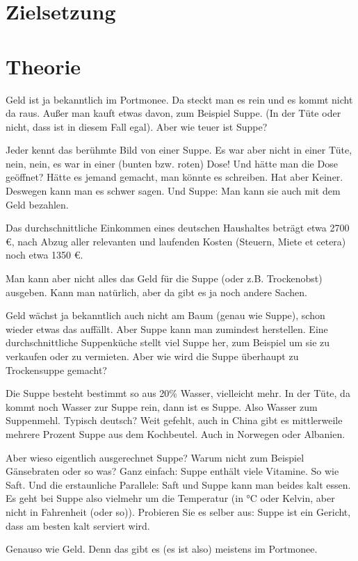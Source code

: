 \section{Zielsetzung}

\section{Theorie}
\label{sec:Theorie}
Geld ist ja bekanntlich im Portmonee. Da steckt man es rein und es kommt nicht da raus. Außer man kauft etwas davon, zum Beispiel Suppe. (In der Tüte oder nicht, dass ist in diesem Fall egal). Aber wie teuer ist Suppe?

Jeder kennt das berühmte Bild von einer Suppe. Es war aber nicht in einer Tüte, nein, nein, es war in einer (bunten bzw. roten) Dose! Und hätte man die Dose geöffnet? Hätte es jemand gemacht, man könnte es schreiben. Hat aber Keiner. Deswegen kann man es schwer sagen. Und Suppe: Man kann sie auch mit dem Geld bezahlen.

Das durchschnittliche Einkommen eines deutschen Haushaltes beträgt etwa 2700 €, nach Abzug aller relevanten und laufenden Kosten (Steuern, Miete et cetera) noch etwa 1350 €.

Man kann aber nicht alles das Geld für die Suppe (oder z.B. Trockenobst) ausgeben. Kann man natürlich, aber da gibt es ja noch andere Sachen.

Geld wächst ja bekanntlich auch nicht am Baum (genau wie Suppe), schon wieder etwas das auffällt. Aber Suppe kann man zumindest herstellen. Eine durchschnittliche Suppenküche stellt viel Suppe her, zum Beispiel um sie zu verkaufen oder zu vermieten. Aber wie wird die Suppe überhaupt zu Trockensuppe gemacht?

Die Suppe besteht bestimmt so aus 20\% Wasser, vielleicht mehr. In der Tüte, da kommt noch Wasser zur Suppe rein, dann ist es Suppe. Also Wasser zum Suppenmehl. Typisch deutsch? Weit gefehlt, auch in China gibt es mittlerweile mehrere Prozent Suppe aus dem Kochbeutel. Auch in Norwegen oder Albanien.

Aber wieso eigentlich ausgerechnet Suppe? Warum nicht zum Beispiel Gänsebraten oder so was? Ganz einfach: Suppe enthält viele Vitamine. So wie Saft. Und die erstaunliche Parallele: Saft und Suppe kann man beides kalt essen. Es geht bei Suppe also vielmehr um die Temperatur (in °C oder Kelvin, aber nicht in Fahrenheit (oder so)). Probieren Sie es selber aus: Suppe ist ein Gericht, dass am besten kalt serviert wird.

Genauso wie Geld. Denn das gibt es (es ist also) meistens im Portmonee.
